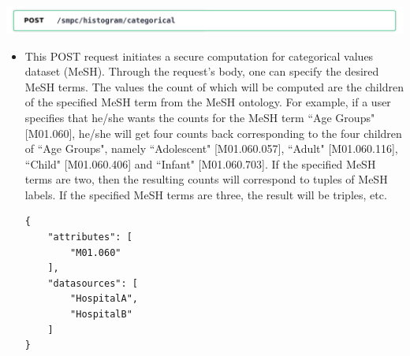 \includegraphics[page=1,width=\textwidth]{figures/post2.pdf}
\begin{itemize}
\item[]
This POST request initiates a secure computation for categorical values dataset (MeSH).
Through the request's body, one can specify the desired MeSH terms.
The values the count of which will be computed are the children of the specified MeSH term from the MeSH ontology.
For example, if a user specifies that he/she wants the counts for the MeSH term ``Age Groups" [M01.060], he/she will get four counts back corresponding to the four children of ``Age Groups", namely ``Adolescent" [M01.060.057], ``Adult" [M01.060.116], ``Child" [M01.060.406] and ``Infant" [M01.060.703].
If the specified MeSH terms are two, then the resulting counts will correspond to tuples of MeSH labels.
If the specified MeSH terms are three, the result will be triples, etc.

{
\begin{verbatim}
{
    "attributes": [
        "M01.060"
    ],
    "datasources": [
        "HospitalA",
        "HospitalB"
    ]
}
\end{verbatim}
\label{sc:histogram-categorical-post}
}
\end{itemize}


